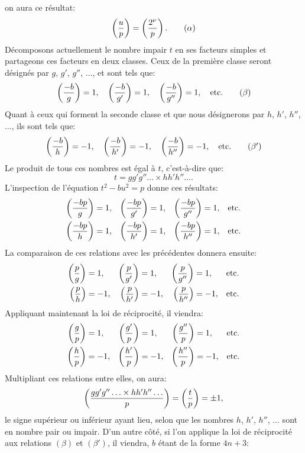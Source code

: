 \noindent
on aura ce résultat:
\begin{equation*}
\left(\frac{u}{p}\right)=\left(\frac{2^\nu}{p}\right).\tag{$\alpha$}
\end{equation*}
Décomposons actuellement le nombre impair $t$ en ses facteurs simples et partageons
ces facteurs en deux classes. Ceux de la première classe seront désignés
par $g$, $g'$, $g''$, $\ldots$, et sont tels que:
\begin{equation*}
\left(\frac{-b}{g}\right)=1,\quad\left(\frac{-b}{g'}\right)=1,\quad\left(\frac{-b}{g''}\right)=1,\quad\text{etc.}\tag{$\beta$}
\end{equation*}
Quant à ceux qui forment la seconde classe et que nous désignerons par $h$,
$h'$, $h''$, $\ldots$, ils sont tels que:
\begin{equation*}
\left(\frac{-b}{h}\right)=-1,\quad\left(\frac{-b}{h'}\right)=-1,\quad\left(\frac{-b}{h''}\right)=-1,\quad\text{etc.}\tag{$\beta'$}
\end{equation*}
Le produit de tous ces nombres est égal à $t$, c'est-à-dire que:
\[
t=gg'g''\ldots\times hh'h''\ldots.
\]
L'inspection de l'équation $t^2-bu^2=p$ donne ces résultats:
\[
\begin{aligned}
\left(\frac{-bp}{g}\right)&=1, &\left(\frac{-bp}{g'}\right)&=1, &\left(\frac{-bp}{g''}\right)&=1, &\text{etc.}\\
\left(\frac{-bp}{h}\right)&=1, &\left(\frac{-bp}{h'}\right)&=1, &\left(\frac{-bp}{h''}\right)&=1, &\text{etc.}
\end{aligned}
\]
La comparaison de ces relations avec les précédentes donnera ensuite:
\[
\begin{aligned}
\left(\frac{p}{g}\right)&=1, &\left(\frac{p}{g'}\right)&=1, &\left(\frac{p}{g''}\right)&=1, &\text{etc.}\\
\left(\frac{p}{h}\right)&=-1, &\left(\frac{p}{h'}\right)&=-1, &\left(\frac{p}{h''}\right)&=-1, &\text{etc.}
\end{aligned}
\]
Appliquant maintenant la loi de réciprocité, il viendra:
\[
\begin{aligned}
\left(\frac{g}{p}\right)&=1, &\left(\frac{g'}{p}\right)&=1, &\left(\frac{g''}{p}\right)&=1, &\text{etc.}\\
\left(\frac{h}{p}\right)&=-1, &\left(\frac{h'}{p}\right)&=-1, &\left(\frac{h''}{p}\right)&=-1, &\text{etc.}
\end{aligned}
\]
Multipliant ces relations entre elles, on aura:
\[
\left(\frac{gg'g''\ldots\times hh'h''\ldots}{p}\right)=\left(\frac{t}{p}\right)=\pm1,
\]
le signe supérieur ou inférieur ayant lieu, selon que les nombres $h$, $h'$, $h''$, $\ldots$
sont en nombre pair ou impair. D'un autre côté, si l'on applique la loi de
réciprocité aux relations $(\beta)$ et $(\beta')$, il viendra, $b$ étant de la forme $4n+3$:
